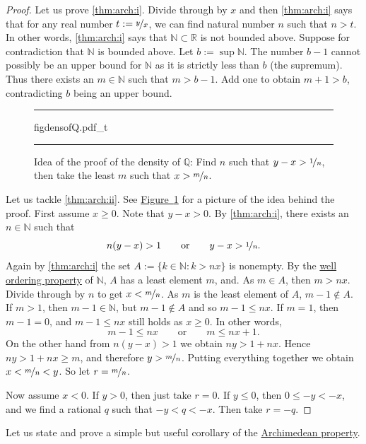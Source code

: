 \documentclass[12pt]{book}
\newenvironment{myfigureht}{%
\begin{figure}[h!t]
\noindent\rule{\textwidth}{0.4pt}\vspace{12pt}\par\centering}%
{\par\noindent\rule{\textwidth}{0.4pt}
\end{figure}}
\newcommand{\R}{{\mathbb{R}}}
\newcommand{\N}{{\mathbb{N}}}
\newcommand{\Q}{{\mathbb{Q}}}
\theoremstyle{plain}
\theoremstyle{remark}
\theoremstyle{definition}
\theoremstyle{exercise}
\theoremstyle{example}
\newcommand{\figureref}[1]{\hyperref[#1]{Figure~\ref*{#1}}}
\begin{document}
\begin{proof}
Let us prove \ref{thm:arch:i}.  Divide through by $x$ and then 
\ref{thm:arch:i} says that for any real number $t:= \nicefrac{y}{x}$,
we can find natural number $n$ such that $n > t$.  In other words,
\ref{thm:arch:i} says that $\N \subset \R$ is not bounded above.
Suppose for contradiction that $\N$ is bounded above.  Let $b := \sup \N$.
The number $b-1$ cannot possibly be an upper bound for $\N$ as it is strictly
less than $b$ (the supremum).  Thus there exists an $m \in \N$ such that $m > b-1$.
Add one to obtain $m+1 > b$, contradicting $b$ being an
upper bound.

\begin{myfigureht}
{figdensofQ.pdf_t}
\caption{Idea of the proof of the density of $\Q$: Find $n$ such that $y-x >
\nicefrac{1}{n}$, then take the least $m$ such that $x >
\nicefrac{m}{n}$.\label{figdensofQ}}
\end{myfigureht}
Let us tackle \ref{thm:arch:ii}.
See \figureref{figdensofQ}
for a picture of the idea behind the proof.
First assume $x \geq 0$.
Note that $y-x > 0$.
By \ref{thm:arch:i}, there exists an $n \in \N$ such that
\begin{equation*}
n(y-x) > 1
\qquad \text{or} \qquad
y-x > \nicefrac{1}{n}.
\end{equation*}
Again by \ref{thm:arch:i} the set 
$A := \{ k \in \N : k > nx \}$ is nonempty.  By the
\hyperlink{wop:link}{well ordering property}
of $\N$, $A$ has a least element $m$, and.  As $m \in A$,
then $m > nx$.
Divide through by $n$ to get $x < \nicefrac{m}{n}$.
As $m$ is the least
element of $A$, $m-1 \notin A$.
If $m > 1$, then $m-1 \in \N$, but $m-1 \notin A$ and so $m-1 \leq nx$.
If $m=1$,
then $m-1 = 0$, and $m-1 \leq nx$ still holds as $x \geq 0$.
In other words,
\begin{equation*}
m-1 \leq nx \qquad \text{or} \qquad m \leq nx+1 .
\end{equation*}
On the other hand
from $n(y-x) > 1$ we obtain $ny > 1+nx$.
Hence $ny > 1+nx \geq m$, and therefore $y > \nicefrac{m}{n}$.
Putting everything together we obtain $x < \nicefrac{m}{n} < y$.
So let $r = \nicefrac{m}{n}$.

Now assume $x < 0$.  If $y > 0$, then just take $r=0$.  If
$y \leq 0$, then $0 \leq -y < -x$, and we
find a rational $q$ such that $-y < q < -x$.  Then take $r = -q$.
\end{proof}

Let us state and prove a simple but useful corollary of the
\hyperref[thm:arch:i]{Archimedean property}.
\end{document}

